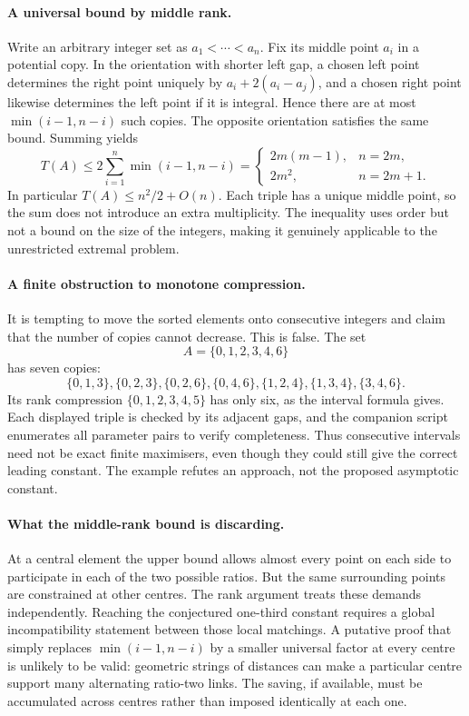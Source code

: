 \documentclass[11pt,a4paper]{article}
\begin{document}
\paragraph{A universal bound by middle rank.}
Write an arbitrary integer set as $a_1<\cdots<a_n$. Fix its middle point $a_i$ in a potential copy. In the orientation with shorter left gap, a chosen left point determines the right point uniquely by $a_i+2(a_i-a_j)$, and a chosen right point likewise determines the left point if it is integral. Hence there are at most $\min(i-1,n-i)$ such copies. The opposite orientation satisfies the same bound. Summing yields
\[
 T(A)\leq2\sum_{i=1}^n\min(i-1,n-i)
 =\begin{cases}
 2m(m-1),&n=2m,\\
 2m^2,&n=2m+1.
 \end{cases}
\]
In particular $T(A)\leq n^2/2+O(n)$. Each triple has a unique middle point, so the sum does not introduce an extra multiplicity. The inequality uses order but not a bound on the size of the integers, making it genuinely applicable to the unrestricted extremal problem.

\paragraph{A finite obstruction to monotone compression.}
It is tempting to move the sorted elements onto consecutive integers and claim that the number of copies cannot decrease. This is false. The set
\[
 A=\{0,1,2,3,4,6\}
\]
has seven copies:
\[
 \{0,1,3\},\{0,2,3\},\{0,2,6\},\{0,4,6\},
 \{1,2,4\},\{1,3,4\},\{3,4,6\}.
\]
Its rank compression $\{0,1,2,3,4,5\}$ has only six, as the interval formula gives. Each displayed triple is checked by its adjacent gaps, and the companion script enumerates all parameter pairs to verify completeness. Thus consecutive intervals need not be exact finite maximisers, even though they could still give the correct leading constant. The example refutes an approach, not the proposed asymptotic constant.

\paragraph{What the middle-rank bound is discarding.}
At a central element the upper bound allows almost every point on each side to participate in each of the two possible ratios. But the same surrounding points are constrained at other centres. The rank argument treats these demands independently. Reaching the conjectured one-third constant requires a global incompatibility statement between those local matchings. A putative proof that simply replaces $\min(i-1,n-i)$ by a smaller universal factor at every centre is unlikely to be valid: geometric strings of distances can make a particular centre support many alternating ratio-two links. The saving, if available, must be accumulated across centres rather than imposed identically at each one.
\end{document}
